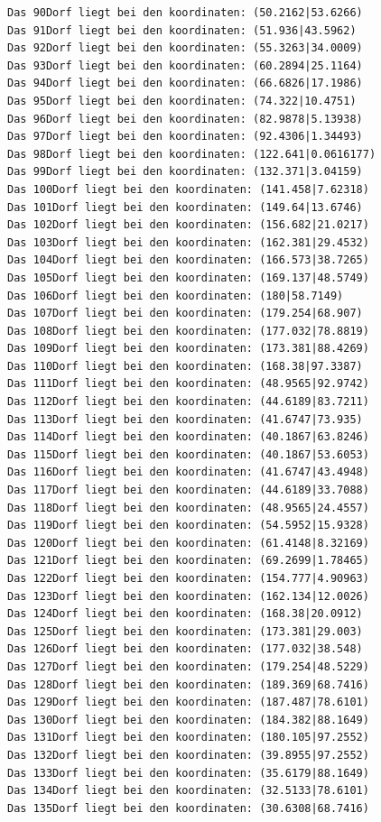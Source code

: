 \documentclass{article}
\begin{document}
\begin{verbatim}
Das 90Dorf liegt bei den koordinaten: (50.2162|53.6266)
Das 91Dorf liegt bei den koordinaten: (51.936|43.5962)
Das 92Dorf liegt bei den koordinaten: (55.3263|34.0009)
Das 93Dorf liegt bei den koordinaten: (60.2894|25.1164)
Das 94Dorf liegt bei den koordinaten: (66.6826|17.1986)
Das 95Dorf liegt bei den koordinaten: (74.322|10.4751)
Das 96Dorf liegt bei den koordinaten: (82.9878|5.13938)
Das 97Dorf liegt bei den koordinaten: (92.4306|1.34493)
Das 98Dorf liegt bei den koordinaten: (122.641|0.0616177)
Das 99Dorf liegt bei den koordinaten: (132.371|3.04159)
Das 100Dorf liegt bei den koordinaten: (141.458|7.62318)
Das 101Dorf liegt bei den koordinaten: (149.64|13.6746)
Das 102Dorf liegt bei den koordinaten: (156.682|21.0217)
Das 103Dorf liegt bei den koordinaten: (162.381|29.4532)
Das 104Dorf liegt bei den koordinaten: (166.573|38.7265)
Das 105Dorf liegt bei den koordinaten: (169.137|48.5749)
Das 106Dorf liegt bei den koordinaten: (180|58.7149)
Das 107Dorf liegt bei den koordinaten: (179.254|68.907)
Das 108Dorf liegt bei den koordinaten: (177.032|78.8819)
Das 109Dorf liegt bei den koordinaten: (173.381|88.4269)
Das 110Dorf liegt bei den koordinaten: (168.38|97.3387)
Das 111Dorf liegt bei den koordinaten: (48.9565|92.9742)
Das 112Dorf liegt bei den koordinaten: (44.6189|83.7211)
Das 113Dorf liegt bei den koordinaten: (41.6747|73.935)
Das 114Dorf liegt bei den koordinaten: (40.1867|63.8246)
Das 115Dorf liegt bei den koordinaten: (40.1867|53.6053)
Das 116Dorf liegt bei den koordinaten: (41.6747|43.4948)
Das 117Dorf liegt bei den koordinaten: (44.6189|33.7088)
Das 118Dorf liegt bei den koordinaten: (48.9565|24.4557)
Das 119Dorf liegt bei den koordinaten: (54.5952|15.9328)
Das 120Dorf liegt bei den koordinaten: (61.4148|8.32169)
Das 121Dorf liegt bei den koordinaten: (69.2699|1.78465)
Das 122Dorf liegt bei den koordinaten: (154.777|4.90963)
Das 123Dorf liegt bei den koordinaten: (162.134|12.0026)
Das 124Dorf liegt bei den koordinaten: (168.38|20.0912)
Das 125Dorf liegt bei den koordinaten: (173.381|29.003)
Das 126Dorf liegt bei den koordinaten: (177.032|38.548)
Das 127Dorf liegt bei den koordinaten: (179.254|48.5229)
Das 128Dorf liegt bei den koordinaten: (189.369|68.7416)
Das 129Dorf liegt bei den koordinaten: (187.487|78.6101)
Das 130Dorf liegt bei den koordinaten: (184.382|88.1649)
Das 131Dorf liegt bei den koordinaten: (180.105|97.2552)
Das 132Dorf liegt bei den koordinaten: (39.8955|97.2552)
Das 133Dorf liegt bei den koordinaten: (35.6179|88.1649)
Das 134Dorf liegt bei den koordinaten: (32.5133|78.6101)
Das 135Dorf liegt bei den koordinaten: (30.6308|68.7416)

\end{verbatim}
\end{document}
